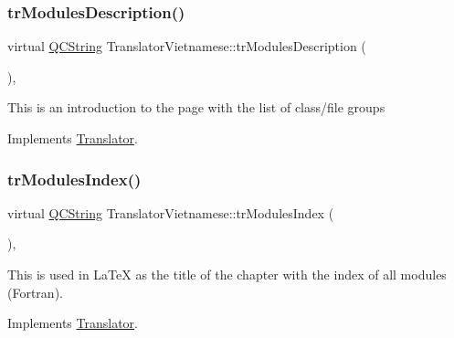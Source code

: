 \mbox{\label{class_translator_vietnamese_aa5c74a42b75f40466758fef49f526083}} 
\subsubsection{\texorpdfstring{trModulesDescription()}{trModulesDescription()}}
{\footnotesize\ttfamily virtual \mbox{\hyperlink{class_q_c_string}{Q\+C\+String}} Translator\+Vietnamese\+::tr\+Modules\+Description (\begin{DoxyParamCaption}{ }\end{DoxyParamCaption})\hspace{0.3cm}{\ttfamily [inline]}, {\ttfamily [virtual]}}

This is an introduction to the page with the list of class/file groups 

Implements \mbox{\hyperlink{class_translator}{Translator}}.

\mbox{\label{class_translator_vietnamese_aa97dd18c74a89ce29ea480c28debb354}} 
\subsubsection{\texorpdfstring{trModulesIndex()}{trModulesIndex()}}
{\footnotesize\ttfamily virtual \mbox{\hyperlink{class_q_c_string}{Q\+C\+String}} Translator\+Vietnamese\+::tr\+Modules\+Index (\begin{DoxyParamCaption}{ }\end{DoxyParamCaption})\hspace{0.3cm}{\ttfamily [inline]}, {\ttfamily [virtual]}}

This is used in La\+TeX as the title of the chapter with the index of all modules (Fortran). 

Implements \mbox{\hyperlink{class_translator}{Translator}}.

\mbox{\label{class_translator_vietnamese_a11b5352a6927a0b1541019781716aa9a}} 
